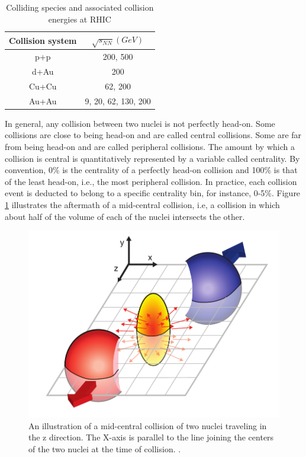 \begin{table}[h!]
\centering
\begin{tabular}{||c c||}
\hline
Collision system & $\sqrt{s_{NN}}(GeV)$ \\ [0.5ex]
\hline
\hline
p+p & 200, 500 \\
d+Au & 200 \\
Cu+Cu & 62, 200 \\
Au+Au & 9, 20, 62, 130, 200 \\ [1ex]
\hline
\end{tabular}
\caption{Colliding species and associated collision energies at RHIC \cite{phdthesisnattrass}}
\label{table:RHIC_specs}
\end{table}


In general, any collision between two nuclei is not perfectly head-on. Some collisions are close to being head-on and are called central collisions. Some are far from being head-on and are called peripheral collisions. The amount by which a collision is central is quantitatively represented by a variable called centrality. By convention, 0\% is the centrality of a perfectly head-on collision and 100\% is that of the least head-on, i.e., the most peripheral collision. In practice, each collision event is deducted to belong to a specific centrality bin, for instance, 0-5\%. Figure \ref{fig:mid-central_collision} illustrates the aftermath of a mid-central collision, i.e, a collision in which about half of the volume of each of the nuclei intersects the other.
\begin{figure}[h]
  \centering
  \includegraphics[width=4.5in]{figures/flow_elliptic_init_v4.pdf}
  \caption{An illustration of a mid-central collision of two nuclei traveling in the z direction. The X-axis is parallel to the line joining the centers of the two nuclei at the time of collision. \cite{Connors:2017ptx}.}\label{fig:mid-central_collision}
\end{figure}

